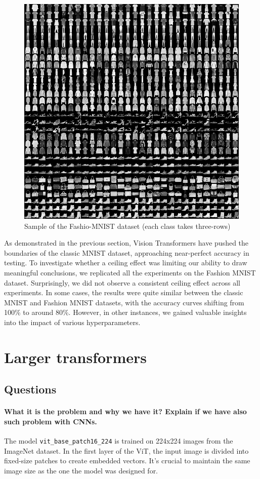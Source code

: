 \begin{figure}[H]
    \centering
    \includegraphics*[width=.5\textwidth]{figs/Transformers/fashion-mnist-sprite.png}
    \caption{Sample of the Fashio-MNIST dataset (each class takes three-rows)}
\end{figure}

As demonstrated in the previous section, Vision Transformers have pushed the boundaries of the classic MNIST dataset, approaching near-perfect accuracy in testing. To investigate whether a ceiling effect was limiting our ability to draw meaningful conclusions, we replicated all the experiments on the Fashion MNIST dataset. Surprisingly, we did not observe a consistent ceiling effect across all experiments. In some cases, the results were quite similar between the classic MNIST and Fashion MNIST datasets, with the accuracy curves shifting from 100\% to around 80\%. However, in other instances, we gained valuable insights into the impact of various hyperparameters.







\section{Larger transformers}
\subsection{Questions}
\paragraph{What it is the problem and why we have it? Explain if we have also such problem with CNNs.}
The model \texttt{vit\_base\_patch16\_224} is trained on 224x224 images from the ImageNet dataset. In the first layer of the ViT, the input image is divided into fixed-size patches to create embedded vectors. It's crucial to maintain the same image size as the one the model was designed for. 

